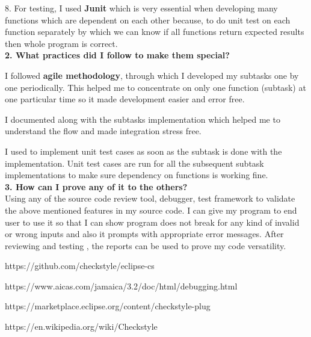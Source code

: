 \documentclass[12pt]{report}
\begin{document}
8.	For testing, I used \textbf{Junit} which is very essential when developing many functions which are dependent on each other because, to do unit test on each function separately by which we can know if all functions return expected results then whole program is correct.\\


\textbf{2. What practices did I follow to make them special?}

I followed \textbf{agile methodology}, through which I developed my subtasks one by one periodically. This helped me to concentrate on only one function (subtask) at one particular time so it made development easier and error free.

I documented along with the subtasks implementation which helped me to understand the flow and made integration stress free.

I used to implement unit test cases as soon as the subtask is done with the implementation. Unit test cases are run for all the subsequent subtask implementations to make sure dependency on functions is working fine.\\

\textbf{3.  How can I prove any of it to the others?}\\

Using any of the source code review tool, debugger, test framework to validate the above mentioned features in my source code. I can give my program to end user to use it so that I can show program does not break for any kind of invalid or wrong inputs and also it prompts with appropriate error messages. After reviewing and testing , the reports can be used to prove my code versatility.

\newpage
 
\begin{thebibliography}{111}
   
https://github.com/checkstyle/eclipse-cs

{}
    https://www.aicas.com/jamaica/3.2/doc/html/debugging.html
  
    https://marketplace.eclipse.org/content/checkstyle-plug
    
   https://en.wikipedia.org/wiki/Checkstyle

\end{thebibliography}
\end{document}
